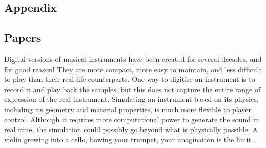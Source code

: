 \ifapp
  \renewcommand\thesection{\thechapter.\arabic{section}}
  \begin{subappendices}
    \begin{appendices}
      \part{Appendix}
         
    \end{appendices}
    \begin{appendices}
      \renewcommand\appendixname{Paper} 
      \setcounter{chapter}{0} %
      \renewcommand\thesection{\thechapter.\arabic{section}}
      \part{Papers}\label{part:papers}
      
      \pagestyle{plain}
      
      \pagestyle{fancy}
    \end{appendices}
  \end{subappendices}
\fi
\titleformat{%
  \chapter
}[%
display%
]{%
  \normalfont\huge 
}{%
  \begin{center}\color{aaublue}\chaptertitlename\ \thechapter\end{center}
}{%
  1cm
}{%
  \thispagestyle{empty}\begin{center}\Large
[%
]
  \end{center}}
\pagebreak
\pagestyle{empty}
\justify
{}Digital versions of musical instruments have been created for several decades, and for good reason! They are more compact, more easy to maintain, and less difficult to play than their real-life counterparts. One way to digitise an instrument is to record it and play back the samples, but this does not capture the entire range of expression of the real instrument. Simulating an instrument based on its physics, including its geometry and material properties, is much more flexible to player control. Although it requires more computational power to generate the sound in real time, the simulation could possibly go beyond what is physically possible. A violin growing into a cello, bowing your trumpet, your imagination is the limit...

